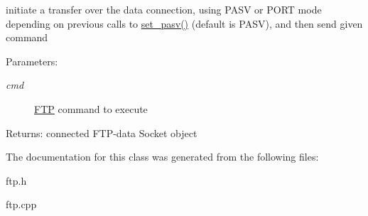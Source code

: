 initiate a transfer over the data connection, using PASV or PORT mode depending on previous calls to \hyperlink{classftplib_1_1FTP_e35230239f093f01fb295ccb007de1b2}{set\_\-pasv()} (default is PASV), and then send given command 

\begin{Desc}
\item[Parameters:]
\begin{description}
\item[{\em cmd}]\hyperlink{classftplib_1_1FTP}{FTP} command to execute \end{description}
\end{Desc}
\begin{Desc}
\item[Returns:]connected FTP-data Socket object \end{Desc}


The documentation for this class was generated from the following files:\begin{CompactItemize}
\item 
ftp.h\item 
ftp.cpp\end{CompactItemize}
